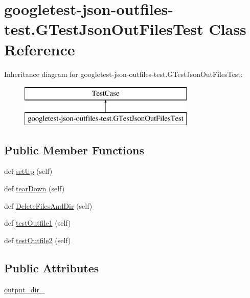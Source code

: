 \hypertarget{classgoogletest-json-outfiles-test_1_1_g_test_json_out_files_test}{}\section{googletest-\/json-\/outfiles-\/test.G\+Test\+Json\+Out\+Files\+Test Class Reference}
\label{classgoogletest-json-outfiles-test_1_1_g_test_json_out_files_test}
Inheritance diagram for googletest-\/json-\/outfiles-\/test.G\+Test\+Json\+Out\+Files\+Test\+:\begin{figure}[H]
\begin{center}
\leavevmode
\includegraphics[height=2.000000cm]{d2/dae/classgoogletest-json-outfiles-test_1_1_g_test_json_out_files_test}
\end{center}
\end{figure}
\subsection*{Public Member Functions}
\begin{DoxyCompactItemize}
\item 
def \mbox{\hyperlink{classgoogletest-json-outfiles-test_1_1_g_test_json_out_files_test_a4d377334ff0527f037a83158faf9f92f}{set\+Up}} (self)
\item 
def \mbox{\hyperlink{classgoogletest-json-outfiles-test_1_1_g_test_json_out_files_test_a26ac17ebec0c197135a217794e11ce58}{tear\+Down}} (self)
\item 
def \mbox{\hyperlink{classgoogletest-json-outfiles-test_1_1_g_test_json_out_files_test_a382ecae11a217d1a972d694996485e4b}{Delete\+Files\+And\+Dir}} (self)
\item 
def \mbox{\hyperlink{classgoogletest-json-outfiles-test_1_1_g_test_json_out_files_test_a3efb5b896cde155ecbc766432acd81ec}{test\+Outfile1}} (self)
\item 
def \mbox{\hyperlink{classgoogletest-json-outfiles-test_1_1_g_test_json_out_files_test_a4ab6e77d7eb415cb339b42e9273730b7}{test\+Outfile2}} (self)
\end{DoxyCompactItemize}
\subsection*{Public Attributes}
\begin{DoxyCompactItemize}
\item 
\mbox{\hyperlink{classgoogletest-json-outfiles-test_1_1_g_test_json_out_files_test_a18e262639002fb485155961593efad20}{output\+\_\+dir\+\_\+}}
\end{DoxyCompactItemize}
